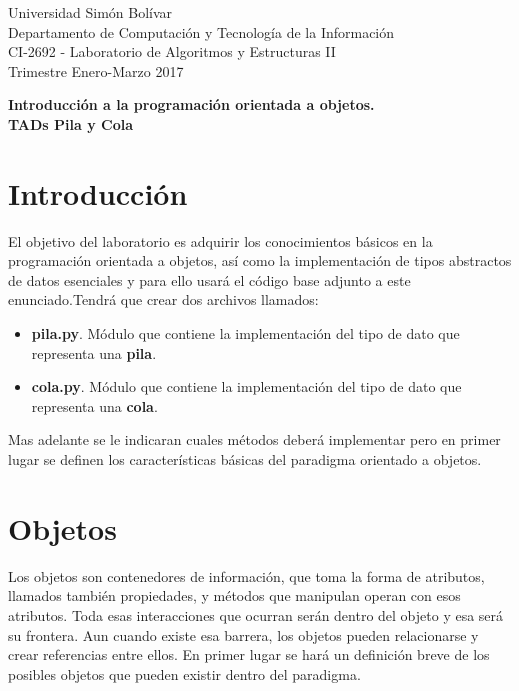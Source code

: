 \documentclass[11pt, letterpaper]{article}
\begin{document}
\begin{flushleft}
{\small
Universidad Simón Bolívar\\
Departamento de Computación y Tecnología de la Información\\
CI-2692 - Laboratorio de Algoritmos y Estructuras II\\
Trimestre Enero-Marzo 2017
}
\end{flushleft}

\vspace{1em}
\begin{center}
{\LARGE
\textbf{
Introducción a la programación orientada a objetos.\\
TADs Pila y Cola
}}
\end{center}
\vspace{1em}

\section*{Introducción}
El objetivo del laboratorio es adquirir los conocimientos básicos en la programación orientada a objetos, así como la implementación de tipos abstractos de datos esenciales y para ello usará el código base adjunto a este enunciado.Tendrá que crear dos archivos llamados:

\begin{itemize}
    \item \textbf{pila.py}. Módulo que contiene la implementación del tipo de dato que representa una \textbf{pila}.
    \item \textbf{cola.py}. Módulo que contiene la implementación del tipo de dato que representa una \textbf{cola}.
\end{itemize}

Mas adelante se le indicaran cuales métodos deberá implementar pero en primer lugar se definen los características básicas del paradigma orientado a objetos.

\section*{Objetos}
Los objetos son contenedores de información, que toma la forma de atributos, llamados también propiedades, y métodos que manipulan operan con esos atributos. Toda esas interacciones que ocurran serán dentro del objeto y esa será su frontera. Aun cuando existe esa barrera, los objetos pueden relacionarse y crear referencias entre ellos. En primer lugar se hará un definición breve de los posibles objetos que pueden existir dentro del paradigma.
\end{document}

